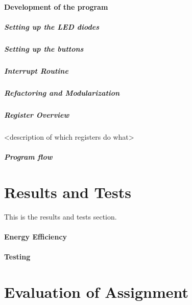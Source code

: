 \documentclass{article}
\begin{document}
\subsection{Development of the program}

\subsubsection{Setting up the LED diodes}

\subsubsection{Setting up the buttons}

\subsubsection{Interrupt Routine}

\subsubsection{Refactoring and Modularization}

\subsubsection{Register Overview}

<description of which registers do what>

\subsubsection{Program flow}



\part{Results and Tests}

This is the results and tests section.

\subsection{Energy Efficiency}

\subsection{Testing}

\part{Evaluation of Assignment}
\end{document}
